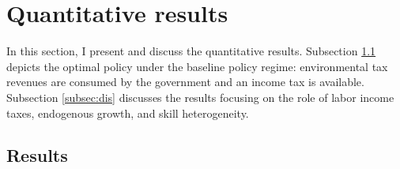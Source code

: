 \section{Quantitative results}\label{sec:res}


In this section, I present and discuss the quantitative results.
Subsection \ref{subsec:mr} depicts the optimal policy under the baseline policy regime: environmental tax revenues are consumed by the government and an income tax is available. Subsection \ref{subsec:dis} discusses the results focusing on the role of labor income taxes, endogenous growth, and skill heterogeneity. 


\subsection{Results}\label{subsec:mr}


